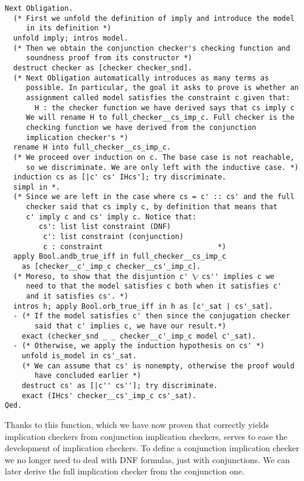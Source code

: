 \begin{verbatim}
Next Obligation.
  (* First we unfold the definition of imply and introduce the model
     in its definition *)
  unfold imply; intros model.
  (* Then we obtain the conjunction checker's checking function and 
     soundness proof from its constructor *)
  destruct checker as [checker checker_snd].
  (* Next Obligation automatically introduces as many terms as 
     possible. In particular, the goal it asks to prove is whether an 
     assignment called model satisfies the constraint c given that:
       H : the checker function we have derived says that cs imply c
     We will rename H to full_checker__cs_imp_c. Full checker is the
     checking function we have derived from the conjunction 
     implication checker's *)
  rename H into full_checker__cs_imp_c.
  (* We proceed over induction on c. The base case is not reachable,
     so we discriminate. We are only left with the inductive case. *)
  induction cs as [|c' cs' IHcs']; try discriminate.
  simpl in *.
  (* Since we are left in the case where cs = c' :: cs' and the full
     checker said that cs imply c, by definition that means that
     c' imply c and cs' imply c. Notice that:
        cs': list list constraint (DNF)
         c': list constraint (conjunction)
         c : constraint                           *)
  apply Bool.andb_true_iff in full_checker__cs_imp_c 
    as [checker__c'_imp_c checker__cs'_imp_c].
  (* Moreso, to show that the disjuntion c' \⁄ cs'' implies c we
     need to that the model satisfies c both when it satisfies c' 
     and it satisfies cs'. *)
  intros h; apply Bool.orb_true_iff in h as [c'_sat | cs'_sat].
  - (* If the model satisfies c' then since the conjugation checker
       said that c' implies c, we have our result.*)
    exact (checker_snd _ _ checker__c'_imp_c model c'_sat).
  - (* Otherwise, we apply the induction hypothesis on cs' *)
    unfold is_model in cs'_sat.
    (* We can assume that cs' is nonempty, otherwise the proof would
       have concluded earlier *)
    destruct cs' as [|c'' cs'']; try discriminate.
    exact (IHcs' checker__cs'_imp_c cs'_sat).
Qed.
\end{verbatim}

Thanks to this function, which we have now proven that correctly yields
implication checkers from conjunction implication checkers, serves to ease the 
development of implication checkers. To define a conjunction implication checker
we no longer need to deal with DNF formulas, just with conjunctions. We can later
derive the full implication checker from the conjunction one.

